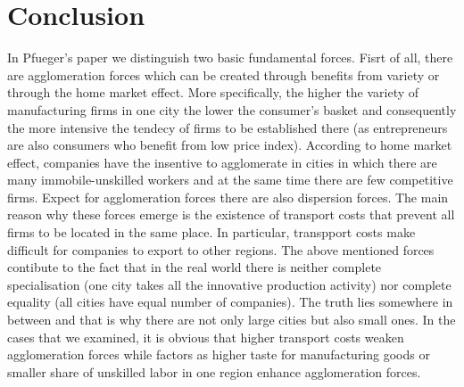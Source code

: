 \documentclass[11pt]{article}
\begin{document}
\section{Conclusion}
In Pfueger's paper we distinguish two basic fundamental forces. Fisrt of all, there are agglomeration forces which can be created through benefits from variety or through the home market effect. More specifically, the higher the variety of manufacturing firms in one city the lower the consumer's basket and consequently the more intensive the tendecy of firms to be established there (as entrepreneurs are also consumers who benefit from low price index). According to home market effect, companies have the insentive to agglomerate in cities in which there are many immobile-unskilled workers and at the same time there are few competitive firms. Expect for agglomeration forces there are also dispersion forces. The main reason why these forces emerge is the existence of transport costs that prevent all firms to be located in the same place. In particular, transpport costs make difficult for companies to export to other regions. The above mentioned forces contibute to the fact that in the real world there is neither complete specialisation (one city takes all the innovative production activity) nor complete equality (all cities have equal number of companies). The truth lies somewhere in between and that is why there are not only large cities but also small ones. In the cases that we examined, it is obvious that higher transport costs weaken agglomeration forces while factors as higher taste for manufacturing goods or smaller share of unskilled labor in one region enhance agglomeration forces.
\end{document}

